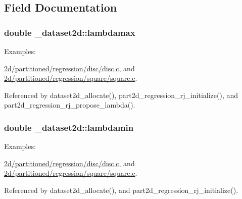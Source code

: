 \subsection{Field Documentation}
\subsubsection[{\texorpdfstring{lambdamax}{lambdamax}}]{\setlength{\rightskip}{0pt plus 5cm}double \+\_\+dataset2d\+::lambdamax}\hypertarget{struct__dataset2d_aeac50b426071c64850da07bc7f084f43}{}\label{struct__dataset2d_aeac50b426071c64850da07bc7f084f43}
\begin{Desc}
\item[Examples\+: ]\par
\hyperlink{2d_2partitioned_2regression_2disc_2disc_8c-example}{2d/partitioned/regression/disc/disc.\+c}, and \hyperlink{2d_2partitioned_2regression_2square_2square_8c-example}{2d/partitioned/regression/square/square.\+c}.\end{Desc}


Referenced by dataset2d\+\_\+allocate(), part2d\+\_\+regression\+\_\+rj\+\_\+initialize(), and part2d\+\_\+regression\+\_\+rj\+\_\+propose\+\_\+lambda().

\subsubsection[{\texorpdfstring{lambdamin}{lambdamin}}]{\setlength{\rightskip}{0pt plus 5cm}double \+\_\+dataset2d\+::lambdamin}\hypertarget{struct__dataset2d_ad6ecdb33d6da1a66b09c395e3b96ee3d}{}\label{struct__dataset2d_ad6ecdb33d6da1a66b09c395e3b96ee3d}
\begin{Desc}
\item[Examples\+: ]\par
\hyperlink{2d_2partitioned_2regression_2disc_2disc_8c-example}{2d/partitioned/regression/disc/disc.\+c}, and \hyperlink{2d_2partitioned_2regression_2square_2square_8c-example}{2d/partitioned/regression/square/square.\+c}.\end{Desc}


Referenced by dataset2d\+\_\+allocate(), and part2d\+\_\+regression\+\_\+rj\+\_\+initialize().

